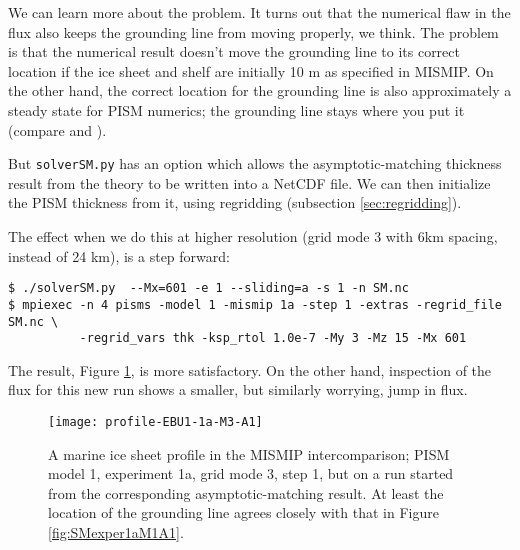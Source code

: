 We can learn more about the problem.  It turns out that the numerical flaw in the flux also keeps the grounding line from moving properly, we think.  The problem is that the numerical result doesn't move the grounding line to its correct location if the ice sheet and shelf are initially 10 m as specified in MISMIP.  On the other hand, the correct location for the grounding line is also approximately a steady state for PISM numerics; the grounding line stays where you put it (compare \cite{SchoofMarine2} and \cite{VieliPayne}).

But \texttt{solverSM.py} has an option which allows the asymptotic-matching thickness result from the \cite{SchoofMarine1} theory to be written into a NetCDF file.  We can then initialize the PISM thickness from it, using regridding (subsection \ref{sec:regridding}).

The effect when we do this at higher resolution (grid mode 3 with 6km spacing, instead of 24 km), is a step forward:

\begin{verbatim}
$ ./solverSM.py  --Mx=601 -e 1 --sliding=a -s 1 -n SM.nc
$ mpiexec -n 4 pisms -model 1 -mismip 1a -step 1 -extras -regrid_file SM.nc \
          -regrid_vars thk -ksp_rtol 1.0e-7 -My 3 -Mz 15 -Mx 601
\end{verbatim}
\noindent The result, Figure \ref{fig:MISMIPmodel1exper1aM3A1FROMSM}, is more satisfactory.  On the other hand, inspection of the flux for this new run shows a smaller, but similarly worrying, jump in flux.

\begin{figure}[ht]
\centering
\texttt{[image: profile-EBU1-1a-M3-A1]}
\caption{A marine ice sheet profile in the MISMIP intercomparison; PISM model 1, experiment 1a, grid mode 3, step 1, but on a run started from the corresponding asymptotic-matching result.  At least the location of the grounding line agrees closely with that in Figure \ref{fig:SMexper1aM1A1}.}
\label{fig:MISMIPmodel1exper1aM3A1FROMSM}
\end{figure}



